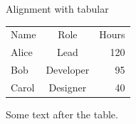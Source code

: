 \documentclass{beamer}
\begin{document}
\begin{frame}{Alignment with tabular}
  \begin{tabular}{lcr}
    Name & Role & Hours \\
    Alice & Lead & 120 \\
    Bob & Developer & 95 \\
    Carol & Designer & 40 \\
  \end{tabular}

  \vspace{1em}
  Some text after the table.
\end{frame}
\end{document}
